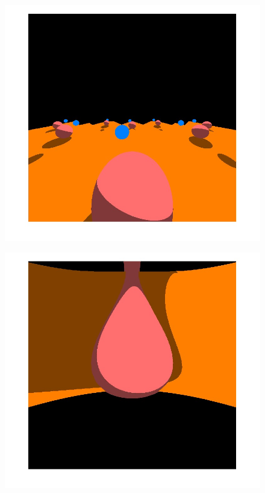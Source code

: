 \documentclass[titlepage]{article}
\begin{document}
\begin{figure}[H]
\begin{minipage}[t]{.33\textwidth}
  \includegraphics[width=1\linewidth]{Images/Torus.jpg}
  \label{fig:Flat torus render}
\end{minipage}
\begin{minipage}[t]{.33\textwidth}
  \centering
  \includegraphics[width=1\linewidth]{Images/2Sphere.jpg}
  \label{fig:2Sphere render}
\end{minipage}
\end{figure}
\end{document}

